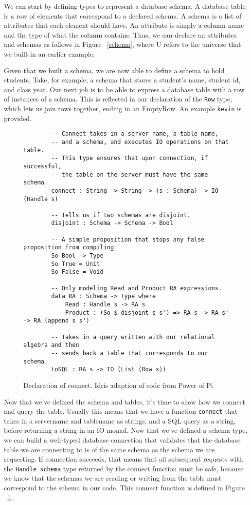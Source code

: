 We can start by defining types to represent a database schema. A database table
is a row of elements that correspond to a declared schema. A schema is a list of
attributes that each element should have. An attribute is simply a column name
and the type of what the column contains. Thus, we can declare an attributes and
schemas as follows in Figure ~\ref{schema}, where U refers to the universe that
we built in an earlier example. 

Given that we built a schema, we are now able to define a schema to hold
students. Take, for example, a schema that stores a student's name, student id,
and class year. Our next job is to be able to express a database table with a
row of instances of a schema. This is reflected in our declaration of the
\texttt{Row} type, which lets us join rows together, ending in an EmptyRow. An
example \texttt{kevin} is provided. 

\begin{figure}[ht!]
    \caption{Declaration of connect. Idris adaption of code from Power of Pi
    \protect\cite{power_of_pi}}
    \label{connect}
    \begin{lstlisting}
        -- Connect takes in a server name, a table name, 
        -- and a schema, and executes IO operations on that table. 
        -- This type ensures that upon connection, if successful, 
        -- the table on the server must have the same schema. 
        connect : String -> String -> (s : Schema) -> IO (Handle s)

        -- Tells us if two schemas are disjoint. 
        disjoint : Schema -> Schema -> Bool

        -- A simple proposition that stops any false proposition from compiling
        So Bool -> Type
        So True = Unit
        So False = Void

        -- Only modeling Read and Product RA expressions.
        data RA : Schema -> Type where
            Read : Handle s -> RA s
            Product : (So $ disjoint s s') => RA s -> RA s' -> RA (append s s')
        
        -- Takes in a query written with our relational algebra and then 
        -- sends back a table that corresponds to our schema. 
        toSQL : RA s -> IO (List (Row s))
    \end{lstlisting}
\end{figure}

Now that we've defined the schema and tables, it's time to show how we connect
and query the table. Usually this means that we have a function \texttt{connect}
that takes in a servername and tablename as strings, and a SQL query as a
string, before returning a string in an IO monad. Now that we've defined a
schema type, we can build a well-typed database connection that validates that
the database table we are connecting to is of the same schema as the schema we
are requesting. If connection succeeds, that means that all subsequent requests
with the \texttt{Handle schema} type returned by the connect function must be
safe, because we know that the schemas we are reading or writing from the table
must correspond to the schema in our code. This connect function is defined in
Figure ~\ref{connect}. 

